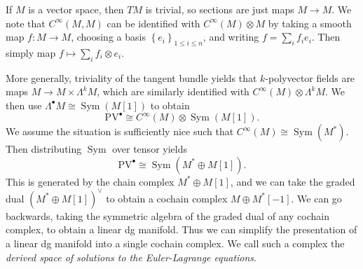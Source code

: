If $M$ is a vector space, then $TM$ is trivial, so sections are just maps $M\to M$. We note that $C^\infty (M,M)$ can be identified with $C^\infty (M)\otimes M$ by taking a smooth map $f : M \to M$, choosing a basis $\left\{ e_i \right\} _{1\leq i\leq n} $, and writing $f=\sum_{i} f_ie_i$. Then simply map $f\mapsto \sum_{i} f_i\otimes e_i$.

More generally, triviality of the tangent bundle yields that $k$-polyvector fields are maps $M\to M\times \Lambda ^kM$, which are similarly identified with $C^\infty (M)\otimes \Lambda ^kM$. We then use $\Lambda ^{\bullet} M \cong \operatorname{Sym} (M[1])$ to obtain
\[
	\mathrm{PV} ^{\bullet} \cong C^\infty (M)\otimes \operatorname{Sym} (M[1])
.\]
We assume the situation is sufficiently nice such that $C^\infty (M) \cong \operatorname{Sym} (M^*)$. Then distributing $\operatorname{Sym} $ over tensor yields
\[
	\mathrm{PV}^{\bullet} \cong \operatorname{Sym} (M^* \oplus M[1])
.\]
This is generated by the chain complex $M^* \oplus M[1]$, and we can take the graded dual $(M^*\oplus M[1])^{\vee } $ to obtain a cochain complex $M\oplus M^*[-1]$. We can go backwards, taking the symmetric algebra of the graded dual of any cochain complex, to obtain a linear dg manifold. Thus we can simplify the presentation of a linear dg manifold into a single cochain complex. We call such a complex the \emph{derived space of solutions to the Euler-Lagrange equations}.

